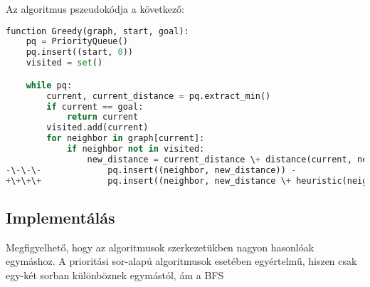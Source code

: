 Az algoritmus pszeudokódja a következő:

\begin{lstlisting}[language={Python}, style=gitdiff]
function Greedy(graph, start, goal):
    pq = PriorityQueue()
    pq.insert((start, 0))
    visited = set()

    while pq:
        current, current_distance = pq.extract_min()
        if current == goal:
            return current
        visited.add(current)
        for neighbor in graph[current]:
            if neighbor not in visited:
                new_distance = current_distance \+ distance(current, neighbor)
-\-\-\-             pq.insert((neighbor, new_distance)) -
+\+\+\+             pq.insert((neighbor, new_distance \+ heuristic(neighbor))) +
\end{lstlisting}

\subsection{Implementálás}

Megfigyelhető, hogy az algoritmusok szerkezetükben nagyon hasonlóak egymáshoz. A prioritási sor-alapú algoritmusok esetében egyértelmű, hiszen csak egy-két sorban különböznek egymástól, ám a BFS 

